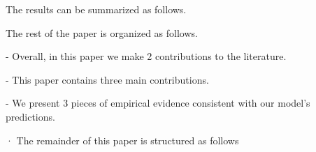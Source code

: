 The results can be summarized as follows. 

The rest of the paper is organized as follows. 

- Overall, in this paper we make 2 contributions to the literature.

- This paper contains three main contributions.

- We present 3 pieces of empirical evidence consistent with our model’s predictions.

· The remainder of this paper is structured as follows
